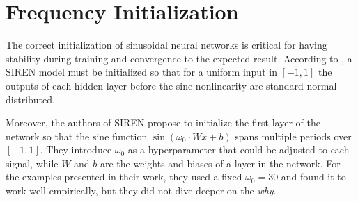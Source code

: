 


\section{Frequency Initialization}

The correct initialization of sinusoidal neural networks is critical for having stability during training and convergence to the expected result. According to \cite{sitzmann2019siren}, a SIREN model must be initialized so that for a uniform input in $[-1, 1]$ the outputs of each hidden layer before the sine nonlinearity are standard normal distributed. 

Moreover, the authors of SIREN propose to initialize the first layer of the network so that the sine function $\sin(\omega_0 \cdot W x + b)$ spans multiple periods over $[-1, 1]$. They introduce $\omega_0$ as a hyperparameter that could be adjusted to each signal, while $W$ and $b$ are the weights and biases of a layer in the network. For the examples presented in their work, they used a fixed $\omega_0=30$ and found it to work well empirically, but they did not dive deeper on the \emph{why}.

